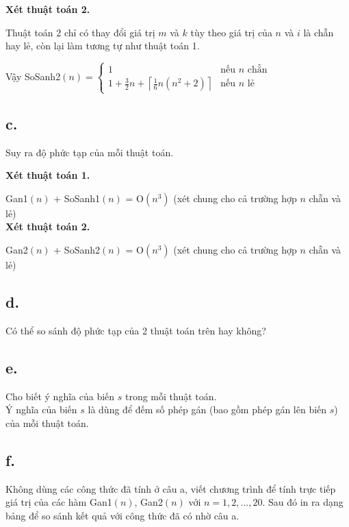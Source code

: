 \documentclass[12pt, a4paper, fleqn]{article}
\begin{document}
	\textbf{Xét thuật toán 2.}
	
	Thuật toán 2 chỉ có thay đổi giá trị $m$ và $k$ tùy theo giá trị của $n$ và $i$ là chẵn hay lẻ, còn lại làm tương tự như thuật toán 1.
	
	Vậy SoSanh2$(n) = {
		\begin{cases}
		1 & {\text{nếu $n$ chẵn}} \\
		\displaystyle 1 + \frac{3}{2} n + \left\lceil \frac{1}{6} n(n^2 + 2) \right\rceil & {\text{nếu $n$ lẻ}}
		\end{cases}
	}$

	\subsection*{c.}
	
	Suy ra độ phức tạp của mỗi thuật toán.
	
	\textbf{Xét thuật toán 1.}
	
	Gan1$(n)$ + SoSanh1$(n)$ = O$(n^3)$ (xét chung cho cả trường hợp $n$ chẵn và lẻ) \\
	
	\textbf{Xét thuật toán 2.}
	
	Gan2$(n)$ + SoSanh2$(n)$ = O$(n^3)$ (xét chung cho cả trường hợp $n$ chẵn và lẻ)
	
	\subsection*{d.}
	
	Có thể so sánh độ phức tạp của 2 thuật toán trên hay không?	
	
	\subsection*{e.}
	
	Cho biết ý nghĩa của biến $s$ trong mỗi thuật toán. \\
	
	Ý nghĩa của biến $s$ là dùng để đếm số phép gán (bao gồm phép gán lên biến $s$) của mỗi thuật toán.
	
	\subsection*{f.}
	
	Không dùng các công thức đã tính ở câu a, viết chương trình để tính trực tiếp giá trị của các hàm Gan1$(n)$, Gan2$(n)$ với $n = 1, 2, ..., 20$. Sau đó in ra dạng bảng để so sánh kết quả với công thức đã có nhờ câu a.
	
\end{document}
